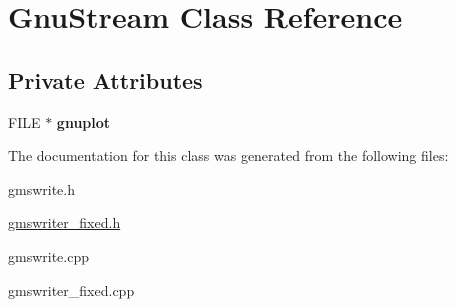 \hypertarget{classGnuStream}{
\section{GnuStream Class Reference}
\label{classGnuStream}
}
\subsection*{Private Attributes}
\begin{DoxyCompactItemize}
\item 
\hypertarget{classGnuStream_a44e52f803517392d9660696fd7a04d1a}{
FILE $\ast$ {\bfseries gnuplot}}
\label{classGnuStream_a44e52f803517392d9660696fd7a04d1a}

\end{DoxyCompactItemize}


The documentation for this class was generated from the following files:\begin{DoxyCompactItemize}
\item 
gmswrite.h\item 
\hyperlink{gmswriter__fixed_8h}{gmswriter\_\-fixed.h}\item 
gmswrite.cpp\item 
gmswriter\_\-fixed.cpp\end{DoxyCompactItemize}
